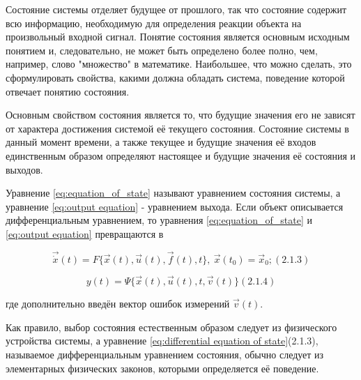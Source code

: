 		Состояние системы отделяет будущее от прошлого, так что состо­яние содержит всю информацию, необходимую для определения
		реакции объекта на произвольный входной сигнал. Понятие состояния является основным исходным понятием и, следовательно,
		не может быть определено более полно, чем, например, слово "множество" в математике. Наибольшее, что можно сделать, это
		сформулировать свойства, какими должна обладать система, поведение которой отвечает понятию состо­яния.



		Основным свойством состояния является то, что будущие значения его не зависят от характера достижения системой её
		текущего состо­яния. Состояние системы в данный момент времени, а также текущее и будущие значения её входов
		единственным образом определяют настоя­щее и будущие значения её состояния и выходов.



		Уравнение \eqref{eq:equation_of_state} называют уравнением состояния системы, а уравне­ние \eqref{eq:output equation} - уравнением выхода. Если объект
		описывается дифференциаль­ным уравнением, то уравнения \eqref{eq:equation_of_state} и \eqref{eq:output equation} превращаются в



\begin{equation}\label{eq:differential equation of state}
		  \vec{\dot x}(t)=F\{\vec x(t),\vec u(t),\vec f(t),t\}, \  \vec x(t_0)=\vec x_0; (2.1.3)
\end{equation}

\begin{equation}
	y(t)=\Psi\{\vec x(t),\vec u(t),t,\vec v(t)\} (2.1.4)
\end{equation}
		 
		где дополнительно введён вектор ошибок измерений  $\vec v(t)$.



		Как правило, выбор состояния естественным образом следует из физического устройства системы, а уравнение \eqref{eq:differential equation of state}(2.1.3),
		называемое диффе­ренциальным уравнением состояния, обычно следует из элементарных физических законов, которыми
		определяется её поведение.

